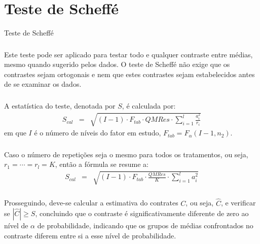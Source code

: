 \documentclass[14pt,aspectratio=1610]{beamer}
\begin{document}
\section{Teste de Scheffé}
\begin{frame}{Teste de Scheffé}
\frametitle{}
\begin{block}{}
\justifying
Este teste pode ser aplicado para testar todo e qualquer contraste entre médias, mesmo quando sugerido pelos dados. O teste de Scheffé não exige que os contrastes 
sejam ortogonais e nem que estes contrastes sejam estabelecidos antes de se examinar os dados.
\end{block}
\end{frame}

\begin{frame}{}
\frametitle{}
\begin{block}{}
\justifying
A estatística do teste, denotada por $S$, é calculada por:
\begin{eqnarray*}
  S_{cal} &=& \sqrt{(I-1)\cdot F_{tab} \cdot QMRes \cdot \sum_{i=1}^{l}\frac{a_i^2}{r_i}}
\end{eqnarray*}
em que $I$ é o número de níveis do fator em estudo, $F_{tab} = F_{\alpha}(I-1, n_2)$.
\end{block}
\end{frame}

\begin{frame}{}
\frametitle{}
\begin{block}{}
\justifying
Caso o número de repetições seja o mesmo para todos os tratamentos, ou seja, $r_1 = \cdots = r_l = K$, então a fórmula se resume a:
\begin{eqnarray*}
S_{cal} &=& \sqrt{(I-1)\cdot F_{tab} \cdot \frac{QMRes}{K} \cdot \sum_{i=1}^{l}a_i^2}
\end{eqnarray*}

\end{block}
\end{frame}

\begin{frame}{}
\frametitle{}
\begin{block}{}
\justifying
Prosseguindo, deve-se calcular a estimativa do contrates $C$, ou seja, $\hat{C}$, e verificar se $|\hat{C}| \ge S$, concluindo que o contraste é significativamente diferente de zero ao nível de $\alpha$ de probabilidade, indicando que os grupos de médias confrontados no contraste diferem entre si a esse nível de probabilidade.
\end{block}
\end{frame}
\end{document}
